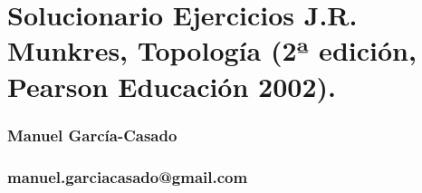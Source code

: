 \documentclass{article}
\begin{document}
\section*{Solucionario Ejercicios J.R. Munkres, Topología (2ª edición, Pearson Educación 2002).}


\subsubsection*{Manuel Garc\'ia-Casado}
\subsubsection*{manuel.garciacasado@gmail.com}




\end{document}
